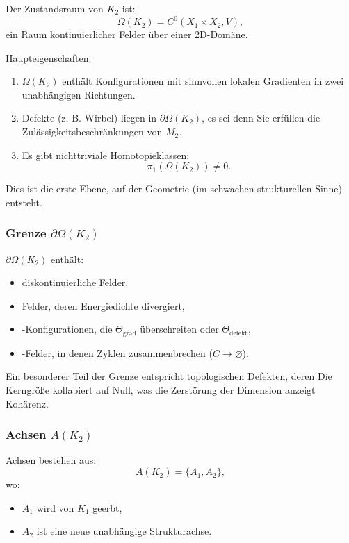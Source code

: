 Der Zustandsraum von $K_2$ ist:
\[
\Omega(K_2) = C^0(X_1 \times X_2, V),
\]
ein Raum kontinuierlicher Felder über einer 2D-Domäne.

Haupteigenschaften:
\begin{enumerate}
    \item $\Omega(K_2)$ enthält Konfigurationen mit sinnvollen lokalen
          Gradienten in zwei unabhängigen Richtungen.
    \item Defekte (z. B. Wirbel) liegen in $\partial\Omega(K_2)$, es sei denn
          Sie erfüllen die Zulässigkeitsbeschränkungen von $M_2$.
    \item Es gibt nichttriviale Homotopieklassen:
          \[
          \pi_1(\Omega(K_2)) \neq 0.
          \]
\end{enumerate}

Dies ist die erste Ebene, auf der Geometrie (im schwachen strukturellen Sinne)
entsteht.

\subsubsection{Grenze \texorpdfstring{$\partial\Omega(K_2)$}{\partial\Omega(K_2)}}

$\partial\Omega(K_2)$ enthält:
\begin{itemize}
    \item diskontinuierliche Felder,
    \item Felder, deren Energiedichte divergiert,
    \item-Konfigurationen, die $\Theta_{\mathrm{grad}}$ überschreiten oder
          $\Theta_{\mathrm{defekt}}$,
    \item-Felder, in denen Zyklen zusammenbrechen ($C \to \varnothing$).
\end{itemize}

Ein besonderer Teil der Grenze entspricht topologischen Defekten, deren
Die Kerngröße kollabiert auf Null, was die Zerstörung der Dimension anzeigt
Kohärenz.

\subsubsection{Achsen \texorpdfstring{$A(K_2)$}{A(K_2)}}

Achsen bestehen aus:
\[
A(K_2) = \{A_1, A_2\},
\]
wo:
\begin{itemize}
    \item $A_1$ wird von $K_1$ geerbt,
    \item $A_2$ ist eine neue unabhängige Strukturachse.
\end{itemize}

